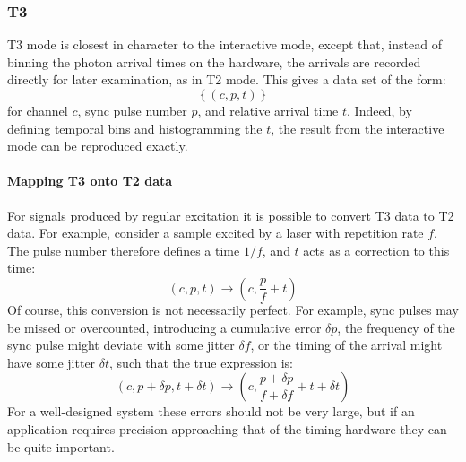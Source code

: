\documentclass{article}
\newcommand{\braces}[1]{\ensuremath{\left\lbrace #1 \right\rbrace}}
\begin{document}
\subsubsection{T3}
T3 mode is closest in character to the interactive mode, except that, instead of binning the photon arrival times on the hardware, the arrivals are recorded directly for later examination, as in T2 mode. This gives a data set of the form:
\begin{equation}
\braces{(c, p, t)}
\end{equation}
for channel $c$, sync pulse number $p$, and relative arrival time $t$. Indeed, by defining temporal bins and histogramming the $t$, the result from the interactive mode can be reproduced exactly.

\paragraph{Mapping T3 onto T2 data}
\label{sec:t3_to_t2}
For signals produced by regular excitation it is possible to convert T3 data to T2 data. For example, consider a sample excited by a laser with repetition rate $f$. The pulse number therefore defines a time $1/f$, and $t$ acts as a correction to this time:
\begin{equation}
\left(c, p, t\right) \rightarrow \left(c, \frac{p}{f} + t\right)
\end{equation}
Of course, this conversion is not necessarily perfect. For example, sync pulses may be missed or overcounted, introducing a cumulative error $\delta p$, the frequency of the sync pulse might deviate with some jitter $\delta f$, or the timing of the arrival might have some jitter $\delta t$, such that the true expression is:
\begin{equation}
\left(c, p+\delta p, t + \delta t \right)
      \rightarrow \left(c, \frac{p+\delta p}{f+\delta f} + t+\delta t\right)
\end{equation}
For a well-designed system these errors should not be very large, but if an application requires precision approaching that of the timing hardware they can be quite important. 

%
\end{document}
